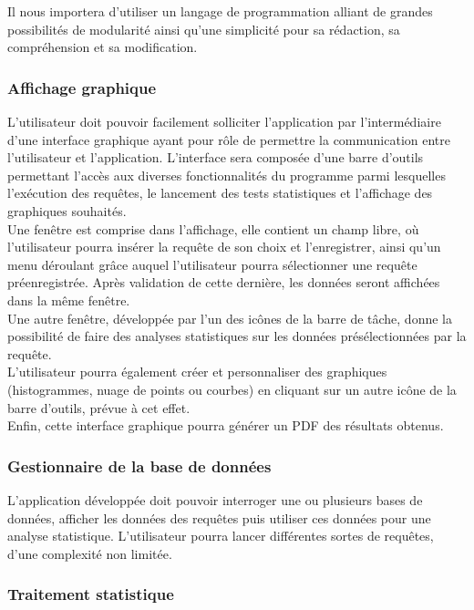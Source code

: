 \documentclass[a4paper]{report}
\begin{document}
	Il nous importera d'utiliser un langage de programmation alliant de grandes possibilités de modularité ainsi qu'une simplicité pour sa rédaction, sa compréhension et sa modification.

\subsubsection{Affichage graphique}

L’utilisateur doit pouvoir facilement solliciter l’application par l’intermédiaire d’une interface graphique ayant pour rôle de permettre la communication entre l’utilisateur et l’application. L’interface sera composée d’une barre d’outils permettant l’accès aux diverses fonctionnalités du programme parmi lesquelles l’exécution des requêtes, le lancement des tests statistiques et l’affichage des graphiques souhaités. \\

	Une fenêtre est comprise dans l’affichage, elle contient un champ libre, où l’utilisateur pourra insérer la requête de son choix et l’enregistrer, ainsi qu'un menu déroulant grâce auquel l’utilisateur pourra sélectionner une requête préenregistrée. Après validation de cette dernière, les données seront affichées dans la même fenêtre. \\

	Une autre fenêtre, développée par l’un des icônes de la barre de tâche, donne la possibilité de faire des analyses statistiques sur les données présélectionnées par la requête. \\

	L’utilisateur pourra également créer et personnaliser des graphiques (histogrammes, nuage de points ou courbes) en cliquant sur un autre icône de la barre d’outils, prévue à cet effet. \\

	Enfin, cette interface graphique pourra générer un PDF des résultats obtenus.


\subsubsection{Gestionnaire de la base de données}

L'application développée doit pouvoir interroger une ou plusieurs bases de données, afficher les données des requêtes puis utiliser ces données pour une analyse statistique. L’utilisateur pourra lancer différentes sortes de requêtes, d’une complexité non limitée. 

\subsubsection{Traitement statistique}
\end{document}
